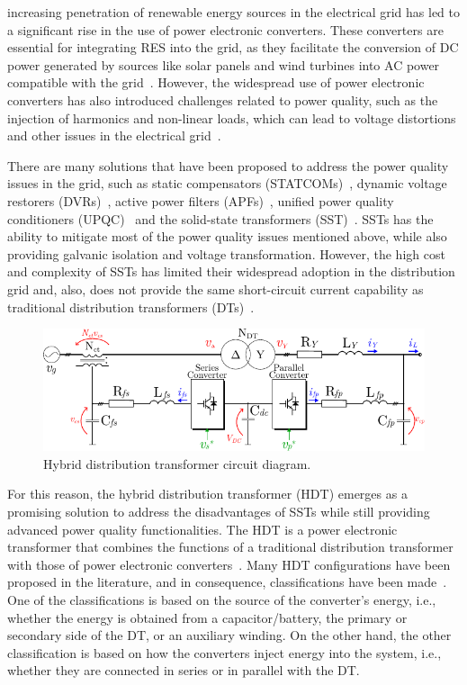  increasing penetration of renewable energy sources in the electrical grid has led to a significant rise in the use of power electronic converters. These converters are essential for integrating RES into the grid, as they facilitate the conversion of DC power generated by sources like solar panels and wind turbines into AC power compatible with the grid~\cite{Blaabjerg2023}. However, the widespread use of power electronic converters has also introduced challenges related to power quality, such as the injection of harmonics and non-linear loads, which can lead to voltage distortions and other issues in the electrical grid~\cite{Najafzadeh2021,Sepasi2023}.

There are many solutions that have been proposed to address the power quality issues in the grid, such as static compensators (STATCOMs)~\cite{Engelbrecht2023}, dynamic voltage restorers (DVRs)~\cite{Kandil2020}, active power filters (APFs)~\cite{Mishra2020}, unified power quality conditioners (UPQC)~\cite{Fujita1998} and the solid-state transformers (SST)~\cite{Huber2019}. SSTs has the ability to mitigate most of the power quality issues mentioned above, while also providing galvanic isolation and voltage transformation. However, the high cost and complexity of SSTs has limited their widespread adoption in the distribution grid and, also, does not provide the same short-circuit current capability as traditional distribution transformers (DTs)~\cite{carrenoConfigurationsPowerTopologies2021}.

\begin{figure}[t!]
    \centering
    \includegraphics[width=\textwidth]{Images/HDT_Diagram.pdf} 
    \caption{Hybrid distribution transformer circuit diagram.}
    \label{fig:HDT_Transformer}
\end{figure}

For this reason, the hybrid distribution transformer (HDT) emerges as a promising solution to address the disadvantages of SSTs while still providing advanced power quality functionalities.
The HDT is a power electronic transformer that combines the functions of a traditional distribution transformer with those of power electronic converters~\cite{haj-maharsiHybridDistributionTransformer2010,matelskiBadaniaEksperymentalneTransformatora2023}. Many HDT configurations have been proposed in the literature, and in consequence, classifications have been made~\cite{carrenoConfigurationsPowerTopologies2021}. One of the classifications is based on the source of the converter's energy, i.e., whether the energy is obtained from a capacitor/battery, the primary or secondary side of the DT, or an auxiliary winding. On the other hand, the other classification is based on how the converters inject energy into the system, i.e., whether they are connected in series or in parallel with the DT. 

